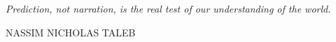 \clearpage

\thispagestyle{empty}
\null\vfill

\settowidth{}
\centering
\parbox{\longest}{%
  \raggedright{\LARGE\itshape%
   Prediction, not narration, is the real test of our
 understanding of the world.\par\bigskip
  }   
  \raggedleft\Large\MakeUppercase{Nassim Nicholas Taleb}\par%
}

\vfill\vfill

\clearpage

